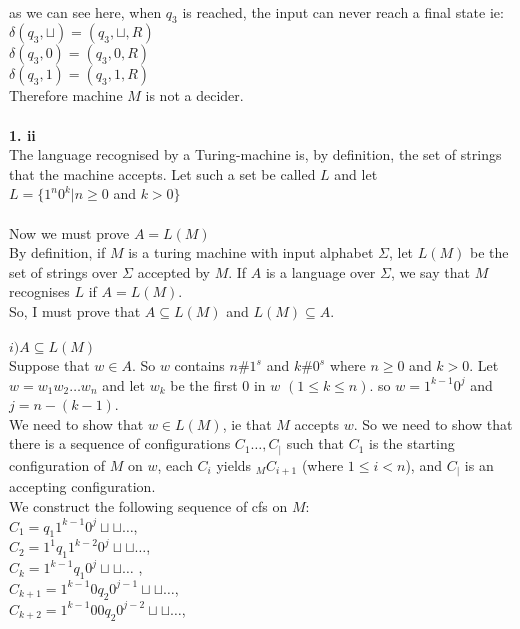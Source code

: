 \documentclass[a4paper,12pt]{article}
\begin{document}
\\
as we can see here, when $q_3$ is reached, the input can never reach a final state ie: \\
$\delta ( q_3 , \sqcup ) = ( q_3 , \sqcup , R )$ \\
$\delta ( q_3 , 0 ) = ( q_3 , 0 , R )$ \\
$\delta ( q_3 , 1 ) = ( q_3 , 1 , R )$ \\
Therefore machine $M$ is not a decider. \\
\\
\textbf{1. ii} \\
The language recognised by a Turing-machine is, by definition, the set of strings that the machine accepts. Let such a set be called $L$ and let \\
$L=\{1^n 0^k | n \geq 0$ and $k > 0\}$ \\
\\
Now we must prove $A=L(M)$ \\
By definition, if $M$ is a turing machine with input alphabet $\Sigma$, let $L(M)$ be the set of strings over $\Sigma$ accepted by $M$. If $A$ is a language over $\Sigma$, we say that $M$ recognises $L$ if $A=L(M)$. \\
So, I must prove that $A \subseteq L(M)$ and $L(M) \subseteq A$. \\
\\
$i) A \subseteq L(M)$ \\
Suppose that $w \in A$. So $w$ contains $n\#1^s$ and $k\#0^s$ where $n \geq 0$ and $k > 0$. Let $w = w_1 w_2 \dots w_n$ and let $w_k$ be the first $0$ in $w$ $(1 \leq  k \leq n)$.
so $w = 1^{k-1}0^{j}$ and $j = n - ( k - 1)$. \\ 
We need to show that $w \in L(M)$, ie that $M$ accepts $w$. So we need to show that there is a sequence of configurations $C_1 \dots, C_|$ such that $C_1$ is the starting configuration of $M$ on $w$, each $C_i$ yields $_M C_{i+1}$ (where $1 \leq i < n $), and $C_|$ is an accepting configuration. \\
We construct the following sequence of cfs on $M$: \\
$C_1 = q_1 1^{k-1} 0^j \sqcup \sqcup \dots$, \\
$C_2 = 1^1 q_1 1^{k-2} 0^j \sqcup \sqcup \dots$, \\
$C_k = 1^{k-1} q_1 0^j \sqcup \sqcup \dots$ , \\
$C_{k+1} = 1^{k-1} 0 q_2 0^{j-1} \sqcup \sqcup \dots$, \\
$C_{k+2} = 1^{k-1} 0 0 q_2 0^{j-2} \sqcup \sqcup \dots$, \\
\end{document}
